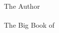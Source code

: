 \begin{titlepage}
  \raggedleft
  {\Large The Author\\ \pdfauthor\\[1in]}    
  {\large The Big Book of\\}
  {\Huge\scshape \bookname\\[.2in]}      
  {\large \bookoneword\\}    
  \vfill
  {\itshape \timeandcompany} 
\end{titlepage}
